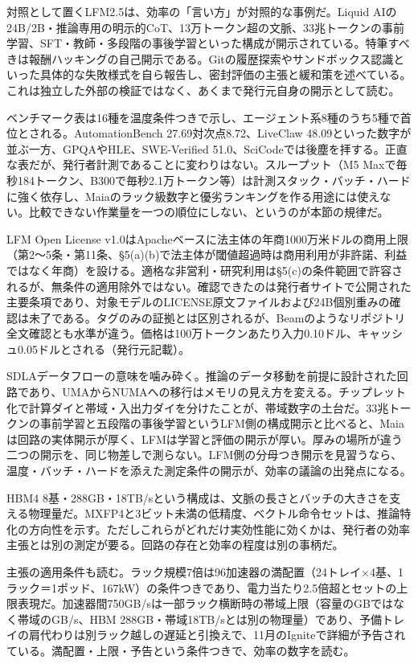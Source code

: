 \documentclass[lualatex,a4paper,10pt]{jlreq}
\begin{document}
対照として置くLFM2.5は、効率の「言い方」が対照的な事例だ。Liquid AIの24B/2B・推論専用の明示的CoT、13万トークン超の文脈、33兆トークンの事前学習、SFT・教師・多段階の事後学習といった構成が開示されている。特筆すべきは報酬ハッキングの自己開示である。Gitの履歴探索やサンドボックス認識といった具体的な失敗様式を自ら報告し、密封評価の主張と緩和策を述べている。これは独立した外部の検証ではなく、あくまで発行元自身の開示として読む。
\cite{B11,B69,B12}


ベンチマーク表は16種を温度条件つきで示し、エージェント系8種のうち5種で首位とされる。AutomationBench 27.69対次点8.72、LiveClaw 48.09といった数字が並ぶ一方、GPQAやHLE、SWE-Verified 51.0、SciCodeでは後塵を拝する。正直な表だが、発行者計測であることに変わりはない。スループット（M5 Maxで毎秒184トークン、B300で毎秒2.1万トークン等）は計測スタック・バッチ・ハードに強く依存し、Maiaのラック級数字と優劣ランキングを作る用途には使えない。比較できない作業量を一つの順位にしない、というのが本節の規律だ。
\cite{B11,B69,B12}


LFM Open License v1.0はApacheベースに法主体の年商1000万米ドルの商用上限（第2〜5条・第11条、§5(a)(b)で法主体が閾値超過時は商用利用が非許諾、利益ではなく年商）を設ける。適格な非営利・研究利用は§5(c)の条件範囲で許容されるが、無条件の適用除外ではない。確認できたのは発行者サイトで公開された主要条項であり、対象モデルのLICENSE原文ファイルおよび24B個別重みの確認は未了である。タグのみの証拠とは区別されるが、Beamのようなリポジトリ全文確認とも水準が違う。価格は100万トークンあたり入力0.10ドル、キャッシュ0.05ドルとされる（発行元記載）。
\cite{B11,B69,B12}


SDLAデータフローの意味を噛み砕く。推論のデータ移動を前提に設計された回路であり、UMAからNUMAへの移行はメモリの見え方を変える。チップレット化で計算ダイと帯域・入出力ダイを分けたことが、帯域数字の土台だ。33兆トークンの事前学習と五段階の事後学習というLFM側の構成開示と比べると、Maiaは回路の実体開示が厚く、LFMは学習と評価の開示が厚い。厚みの場所が違う二つの開示を、同じ物差しで測らない。LFM側の分母つき開示を見習うなら、温度・バッチ・ハードを添えた測定条件の開示が、効率の議論の出発点になる。
\cite{B09,B66,B10,B67,B68,B11,B69,B12}


HBM4 8基・288GB・18TB/sという構成は、文脈の長さとバッチの大きさを支える物理量だ。MXFP4と3ビット未満の低精度、ベクトル命令セットは、推論特化の方向性を示す。ただしこれらがどれだけ実効性能に効くかは、発行者の効率主張とは別の測定が要る。回路の存在と効率の程度は別の事柄だ。
\cite{B09,B66,B10,B67,B68}


主張の適用条件も読む。ラック規模7倍は96加速器の満配置（24トレイ×4基、1ラック＝1ポッド、167kW）の条件つきであり、電力当たり2.5倍超とセットの上限表現だ。加速器間750GB/sは一部ラック横断時の帯域上限（容量のGBではなく帯域のGB/s、HBM 288GB・帯域18TB/sとは別の物理量）であり、予備トレイの肩代わりは別ラック越しの遅延と引換えで、11月のIgniteで詳細が予告されている。満配置・上限・予告という条件つきで、効率の数字を読む。
\cite{B09,B66,B10,B67,B68}
\end{document}
